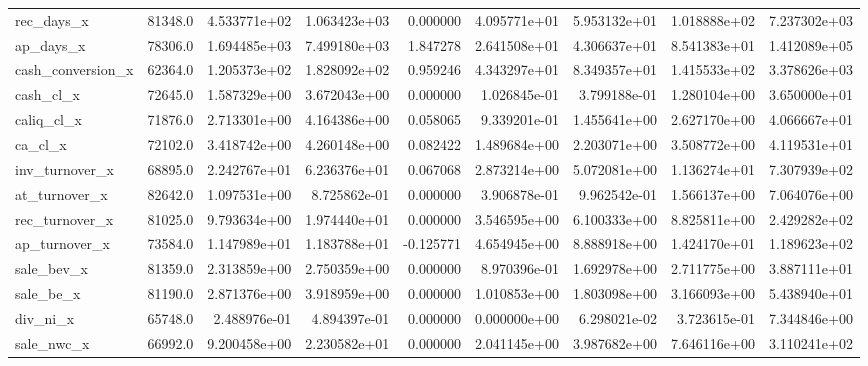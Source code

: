 \documentclass[10pt]{article}
\begin{document}
\begin{landscape}
\begin{longtable}{lrrrrrrrr}
rec\_days\_x              &   81348.0 &  4.533771e+02 &  1.063423e+03 &      0.000000 &  4.095771e+01 &  5.953132e+01 &  1.018888e+02 &  7.237302e+03 \\
ap\_days\_x               &   78306.0 &  1.694485e+03 &  7.499180e+03 &      1.847278 &  2.641508e+01 &  4.306637e+01 &  8.541383e+01 &  1.412089e+05 \\
cash\_conversion\_x       &   62364.0 &  1.205373e+02 &  1.828092e+02 &      0.959246 &  4.343297e+01 &  8.349357e+01 &  1.415533e+02 &  3.378626e+03 \\
cash\_cl\_x               &   72645.0 &  1.587329e+00 &  3.672043e+00 &      0.000000 &  1.026845e-01 &  3.799188e-01 &  1.280104e+00 &  3.650000e+01 \\
caliq\_cl\_x              &   71876.0 &  2.713301e+00 &  4.164386e+00 &      0.058065 &  9.339201e-01 &  1.455641e+00 &  2.627170e+00 &  4.066667e+01 \\
ca\_cl\_x                 &   72102.0 &  3.418742e+00 &  4.260148e+00 &      0.082422 &  1.489684e+00 &  2.203071e+00 &  3.508772e+00 &  4.119531e+01 \\
inv\_turnover\_x          &   68895.0 &  2.242767e+01 &  6.236376e+01 &      0.067068 &  2.873214e+00 &  5.072081e+00 &  1.136274e+01 &  7.307939e+02 \\
at\_turnover\_x           &   82642.0 &  1.097531e+00 &  8.725862e-01 &      0.000000 &  3.906878e-01 &  9.962542e-01 &  1.566137e+00 &  7.064076e+00 \\
rec\_turnover\_x          &   81025.0 &  9.793634e+00 &  1.974440e+01 &      0.000000 &  3.546595e+00 &  6.100333e+00 &  8.825811e+00 &  2.429282e+02 \\
ap\_turnover\_x           &   73584.0 &  1.147989e+01 &  1.183788e+01 &     -0.125771 &  4.654945e+00 &  8.888918e+00 &  1.424170e+01 &  1.189623e+02 \\
sale\_bev\_x              &   81359.0 &  2.313859e+00 &  2.750359e+00 &      0.000000 &  8.970396e-01 &  1.692978e+00 &  2.711775e+00 &  3.887111e+01 \\
sale\_be\_x               &   81190.0 &  2.871376e+00 &  3.918959e+00 &      0.000000 &  1.010853e+00 &  1.803098e+00 &  3.166093e+00 &  5.438940e+01 \\
div\_ni\_x                &   65748.0 &  2.488976e-01 &  4.894397e-01 &      0.000000 &  0.000000e+00 &  6.298021e-02 &  3.723615e-01 &  7.344846e+00 \\
sale\_nwc\_x              &   66992.0 &  9.200458e+00 &  2.230582e+01 &      0.000000 &  2.041145e+00 &  3.987682e+00 &  7.646116e+00 &  3.110241e+02 \\

\end{longtable}
\end{landscape}
\end{document}
